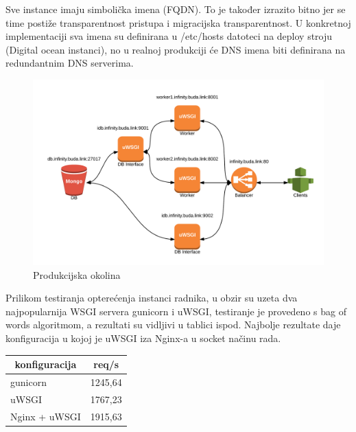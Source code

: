 \documentclass[a4paper,12pt]{article}
\begin{document}
Sve instance imaju simbolička imena (FQDN). To je također izrazito bitno jer se time postiže transparentnost pristupa i migracijska transparentnost. U konkretnoj implementaciji sva imena su definirana u /etc/hosts datoteci na deploy stroju (Digital ocean instanci), no u realnoj produkciji će DNS imena biti definirana na redundantnim DNS serverima.

\begin{figure}[!htbp]
\begin{center}
\includegraphics[width=\textwidth]{infinity.png}
\end{center}
\caption{Produkcijska okolina}\label{production_environment}
\end{figure}

Prilikom testiranja opterećenja instanci radnika, u obzir su uzeta dva najpopularnija WSGI servera gunicorn i uWSGI, testiranje je provedeno s bag of words algoritmom, a rezultati su vidljivi u tablici ispod. Najbolje rezultate daje konfiguracija u kojoj je uWSGI iza Nginx-a u socket načinu rada.

\vspace{0.3cm}

\begin{center}
    \begin{tabular}{ | p{4cm} | p{4cm} |}
    \hline 
    \multicolumn{1}{|c|}{\textbf{konfiguracija}} & \multicolumn{1}{c|}{\textbf{req/s}} \\
    \hline gunicorn & 1245,64 \\ 
    \hline uWSGI & 1767,23 \\
    \hline Nginx + uWSGI & 1915,63 \\
    \hline
    \end{tabular}
\end{center}
\end{document}
